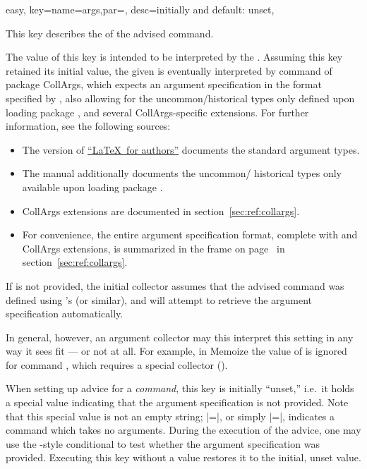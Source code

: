 \documentclass[a4paper,11pt]{article}
\begin{document}
\begin{doc}{easy,
    key={name=args,par=, desc=initially and default: unset},
  }

  This key describes the  of the advised command.

  The value of this key is intended to be interpreted by the
  .  Assuming this key retained its initial value, the
  given  is eventually interpreted by command
   of package CollArgs, which expects an argument
  specification in the format specified by , also allowing for
  the uncommon\slash historical types only defined upon loading package
  , and several CollArgs-specific extensions.  For further
  information, see the following sources:
  \begin{itemize}
  \item The  version
    of \href{https://www.latex-project.org/help/documentation/usrguide.pdf}
    {``\LaTeX\ for authors''} documents the standard argument types.
  \item The  manual additionally documents the uncommon\slash
    historical types only available upon loading package .
  \item CollArgs extensions are documented in section~\ref{sec:ref:collargs}.
  \item For convenience, the entire  argument specification
    format, complete with  and CollArgs extensions, is summarized
    in the frame on page~\pageref{tab:argspec} in
    section~\ref{sec:ref:collargs}.
  \end{itemize}

  If  is not provided, the initial collector
  assumes that the advised command was defined using 's
   (or similar), and will attempt to retrieve the
  argument specification automatically.
  
  In general, however, an argument collector may this interpret this setting 
  in any way it sees fit --- or not at all.  For example, in Memoize the value
  of  is ignored for command , which requires a special
  collector ().
  
  When setting up advice for a \emph{command}, this key is initially ``unset,''
  i.e.\ it holds a special value indicating that the argument specification is
  not provided.  Note that this special value is not an empty string;
  |={}|, or simply |=|, indicates a command
  which takes no arguments.  During the execution of the advice, one may use
  the -style conditional  to test whether the argument specification was
  provided.  Executing this key without a value restores it to the initial,
  unset value.
  

\end{doc}
\end{document}
